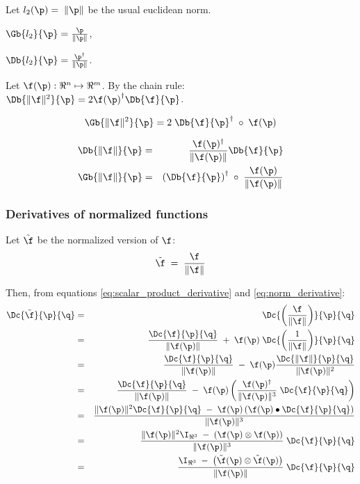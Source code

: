 Let $l_2(\p) = \; \| \p  \|$ be the usual euclidean norm.

$\Gb{l_2}{\p} = {{ \p } \over { \| \p  \|}}$,

$\Db{l_2}{\p} = {{ \p^\dagger } \over { \| \p  \|}}$.

Let $\f(\p) : \Re^n \mapsto \Re^m$.
By the chain rule:
$\Db{\| \f \|^2}{\p}  =  2 {\f(\p)}^{\dagger} \Db{\f}{\p} $.


\begin{equation}
\Gb{\| \f \|^2}{\p}  =  2 \;\Db{\f}{\p}^\dagger \;\circ \;\f(\p)
\end{equation}

\begin{eqnarray}
\label{eq:norm_derivative}
\Db{\| \f \|}{\p}
& = &
{{\f(\p)^\dagger} \over {\| \f(\p) \|}} \Db{\f}{\p}  \\
\Gb{\| \f \|}{\p}
& = &
\left(\Db{\f}{\p}\right)^\dagger \;\circ \;{{\f(\p)} \over { \| \f(\p)  \|}}
\label{eq:norm_gradient}
\end{eqnarray}


\subsubsection{Derivatives of normalized functions}
\label{sec:normalized-function}

Let $\tilde{\f}$ be the normalized version of $\f$:
\begin{equation}
\tilde{\f} \;= \;{{\f} \over {\| \f \|}}
\end{equation}

Then, from equations \ref{eq:scalar_product_derivative}
and \ref{eq:norm_derivative}:
\begin{eqnarray}
\Dc{\tilde{\f}}{\p}{\q}
& = &
\Dc{\left({\f \over {\| \f \|}}\right)}{\p}{\q}
\\
& = &
{\Dc{\f}{\p}{\q} \over {\| \f(\p) \|}}
\; + \;
\f(\p) \; \Dc{\left({1 \over {\| \f \|}}\right)}{\p}{\q} \nonumber \\
& = &
{\Dc{\f}{\p}{\q} \over {\| \f(\p) \|}}
\; - \;
\f(\p) {{\Dc{\| \f \|}{\p}{\q}} \over {\|\f(\p)\|^2}} \nonumber \\
& = &
{\Dc{\f}{\p}{\q} \over {\| \f(\p) \|}}
\; - \;
\f(\p) \left( {{\f(\p)^\dagger} \over {\| \f(\p) \|^3}} \;\Dc{\f}{\p}{\q} \right) \nonumber \\
& = &
{\| \f(\p) \|^2 \Dc{\f}{\p}{\q}
\; - \;
\f(\p)\left( \f(\p) \bullet \Dc{\f}{\p}{\q} \right) }
\over {\| \f(\p) \|^3}  \nonumber \\
& = &
{{\| \f(\p) \|^2 \I_{\Re^3} \;- \;\left( \f(\p) \otimes \f(\p) \right)  }
\over {\| \f(\p) \|^3} }
\;\Dc{\f}{\p}{\q} \nonumber \\
& = &
{{\I_{\Re^3} \;- \;\left( \tilde{\f}(\p) \otimes \tilde{\f}(\p) \right)  }
\over {\| \f(\p) \|} }
\;\Dc{\f}{\p}{\q} \nonumber
\end{eqnarray}

